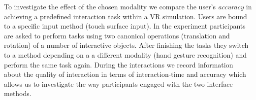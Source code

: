 To investigate the effect of the chosen modality we compare the user's \textit{accuracy} in achieving a predefined interaction task within a VR simulation.
Users are bound to a specific input method (touch surface input).
In the experiment participants are asked to perform tasks using two canonical operations (translation and rotation) of  a number of interactive objects.
After finishing the tasks they switch to a method depending on a a different modality (hand gesture recognition) and perform the same task again.
During the interactions we record information about the quality of interaction in terms of interaction-time and accuracy which allows us to investigate the way participants engaged with the two interface methods.

\fi